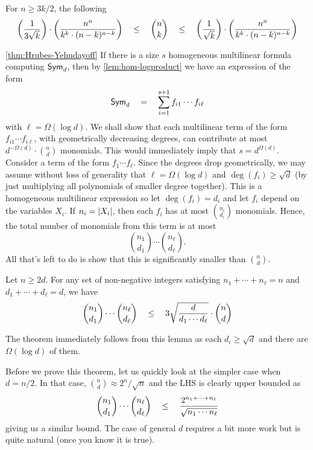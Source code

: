 \begin{lemma}\label{lem:stirling-binom} For $n \geq 3k/2$, the following 
\[
\left(\frac{1}{3\sqrt{k}}\right) \cdot \left(\frac{n^n}{k^k \cdot (n-k)^{n-k}}\right) \quad \leq \quad \binom{n}{k} \quad \leq \quad \left(\frac{1}{\sqrt{k}}\right) \cdot \left(\frac{n^n}{k^k \cdot (n-k)^{n-k}}\right)
\]
\end{lemma}

\begin{proofof}{\autoref{thm:Hrubes-Yehudayoff}}
If there is a size $s$ homogeneous multilinear formula computing $\operatorname{\mathsf{Sym}}_d$, then by \autoref{lem:hom-logproduct} we have an expression of the form
\[
\operatorname{\mathsf{Sym}}_d \quad = \quad \sum_{i=1}^{s+1} f_{i1} \cdots f_{i\ell}
\]
with $\ell = \Omega(\log d)$.
We shall show that each multilinear term of the form $f_{i1} \cdots f_{i\ell}$, with geometrically decreasing degrees, can contribute at most $d^{-\Omega(d)} \cdot \binom{n}{d}$ monomials.
This would immediately imply that $s = d^{\Omega(d)}$. \\


Consider a term of the form $f_1 \cdots f_\ell$. Since the degrees drop geometrically, we may assume without loss of generality that $\ell = \Omega(\log d)$ and $\deg(f_i) \geq \sqrt{d}$ (by just multiplying all polynomials of smaller degree together). This is a homogeneous multilinear expression so let $\deg(f_i) = d_i$ and let $f_i$ depend on the variables $X_i$. If $n_i = \left|X_i\right|$, then each $f_i$ has at most $\binom{n_i}{d_i}$ monomials. Hence, the total number of monomials from this term is at most
\[
\binom{n_1}{d_1} \cdots \binom{n_\ell}{d_\ell}.
\]
All that's left to do is show that this is significantly smaller than $\binom{n}{d}$. 

\begin{lemma}[\cite{HY11a}]\label{lem:HY-prod-binom}
Let $n\geq 2d$. For any set of non-negative integers satisfying $n_1 + \cdots + n_\ell = n$ and $d_1 + \cdots + d_\ell = d$, we have
\[
\binom{n_1}{d_1} \cdots \binom{n_\ell}{d_\ell} \quad \leq \quad 3 \sqrt{\frac{d}{d_1 \cdots d_\ell}} \cdot \binom{n}{d}
\]
\end{lemma}
The theorem immediately follows from this lemma as each $d_i \geq \sqrt{d}$ and there are $\Omega(\log d)$ of them. 

Before we prove this theorem, let us quickly look at the simpler case when $d = n/2$. In that case, $\binom{n}{d} \approx 2^n / \sqrt{n}$ and the LHS is clearly upper bounded as
\[
\binom{n_1}{d_1} \cdots \binom{n_\ell}{d_\ell} \quad \leq \quad \frac{2^{n_1+ \cdots + n_\ell}}{\sqrt{n_1 \cdots n_\ell}}
\]
giving us a similar bound. The case of general $d$ requires a bit more work but is quite natural (once you know it is true). 


\end{proofof}
